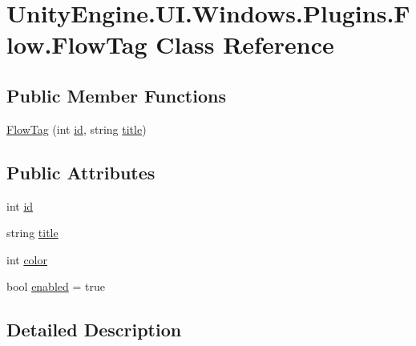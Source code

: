 \hypertarget{class_unity_engine_1_1_u_i_1_1_windows_1_1_plugins_1_1_flow_1_1_flow_tag}{}\section{Unity\+Engine.\+U\+I.\+Windows.\+Plugins.\+Flow.\+Flow\+Tag Class Reference}
\label{class_unity_engine_1_1_u_i_1_1_windows_1_1_plugins_1_1_flow_1_1_flow_tag}
\subsection*{Public Member Functions}
\begin{DoxyCompactItemize}
\item 
\hyperlink{class_unity_engine_1_1_u_i_1_1_windows_1_1_plugins_1_1_flow_1_1_flow_tag_a693392a04667925d12e90e23f8c3ab08}{Flow\+Tag} (int \hyperlink{class_unity_engine_1_1_u_i_1_1_windows_1_1_plugins_1_1_flow_1_1_flow_tag_aed0309f6b6e31c104a765eb5e655a27c}{id}, string \hyperlink{class_unity_engine_1_1_u_i_1_1_windows_1_1_plugins_1_1_flow_1_1_flow_tag_ad129ea3dd4d3404ee174fab6da64abe3}{title})
\end{DoxyCompactItemize}
\subsection*{Public Attributes}
\begin{DoxyCompactItemize}
\item 
int \hyperlink{class_unity_engine_1_1_u_i_1_1_windows_1_1_plugins_1_1_flow_1_1_flow_tag_aed0309f6b6e31c104a765eb5e655a27c}{id}
\item 
string \hyperlink{class_unity_engine_1_1_u_i_1_1_windows_1_1_plugins_1_1_flow_1_1_flow_tag_ad129ea3dd4d3404ee174fab6da64abe3}{title}
\item 
int \hyperlink{class_unity_engine_1_1_u_i_1_1_windows_1_1_plugins_1_1_flow_1_1_flow_tag_ab87693c81f5c4919ae989ef3f1e794f9}{color}
\item 
bool \hyperlink{class_unity_engine_1_1_u_i_1_1_windows_1_1_plugins_1_1_flow_1_1_flow_tag_a8942c4e611005e4f83ac8ecf95b0aaa2}{enabled} = true
\end{DoxyCompactItemize}


\subsection{Detailed Description}


